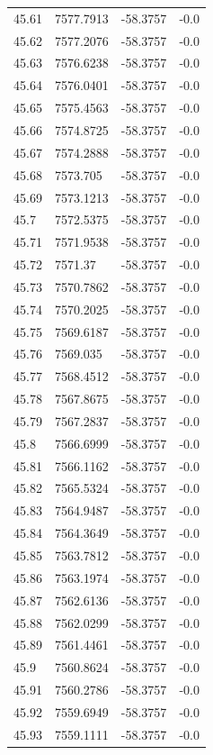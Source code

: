 \begin{table}[H]
\begin{tabular}{llll}
45.61 & 7577.7913 & -58.3757 & -0.0 \\
45.62 & 7577.2076 & -58.3757 & -0.0 \\
45.63 & 7576.6238 & -58.3757 & -0.0 \\
45.64 & 7576.0401 & -58.3757 & -0.0 \\
45.65 & 7575.4563 & -58.3757 & -0.0 \\
45.66 & 7574.8725 & -58.3757 & -0.0 \\
45.67 & 7574.2888 & -58.3757 & -0.0 \\
45.68 & 7573.705 & -58.3757 & -0.0 \\
45.69 & 7573.1213 & -58.3757 & -0.0 \\
45.7 & 7572.5375 & -58.3757 & -0.0 \\
45.71 & 7571.9538 & -58.3757 & -0.0 \\
45.72 & 7571.37 & -58.3757 & -0.0 \\
45.73 & 7570.7862 & -58.3757 & -0.0 \\
45.74 & 7570.2025 & -58.3757 & -0.0 \\
45.75 & 7569.6187 & -58.3757 & -0.0 \\
45.76 & 7569.035 & -58.3757 & -0.0 \\
45.77 & 7568.4512 & -58.3757 & -0.0 \\
45.78 & 7567.8675 & -58.3757 & -0.0 \\
45.79 & 7567.2837 & -58.3757 & -0.0 \\
45.8 & 7566.6999 & -58.3757 & -0.0 \\
45.81 & 7566.1162 & -58.3757 & -0.0 \\
45.82 & 7565.5324 & -58.3757 & -0.0 \\
45.83 & 7564.9487 & -58.3757 & -0.0 \\
45.84 & 7564.3649 & -58.3757 & -0.0 \\
45.85 & 7563.7812 & -58.3757 & -0.0 \\
45.86 & 7563.1974 & -58.3757 & -0.0 \\
45.87 & 7562.6136 & -58.3757 & -0.0 \\
45.88 & 7562.0299 & -58.3757 & -0.0 \\
45.89 & 7561.4461 & -58.3757 & -0.0 \\
45.9 & 7560.8624 & -58.3757 & -0.0 \\
45.91 & 7560.2786 & -58.3757 & -0.0 \\
45.92 & 7559.6949 & -58.3757 & -0.0 \\
45.93 & 7559.1111 & -58.3757 & -0.0 \\

\end{tabular}
\end{table}
